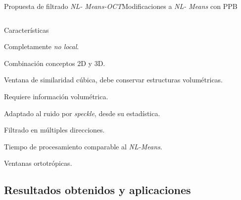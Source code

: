\documentclass[fleqn,10pt]{beamer}
\begin{document}
\begin{frame}{Propuesta de filtrado \emph{NL- Means-OCT}}{Modificaciones a \emph{NL- Means} con PPB}
\begin{multicols}{2}
{\begin{equation*}
			\end{equation*}}
		{\scriptsize \begin{block}{Características}
			\begin{itemize}
				\item Completamente \emph{no local}.	
				\item Combinación conceptos 2D y 3D.
				\item Ventana de similaridad cúbica, debe conservar estructuras volumétricas.
				\item Requiere información volumétrica.
				\item Adaptado al ruido por \emph{speckle}, desde su estadística.
				\item Filtrado en múltiples direcciones.
				{\color{violet}	\item Tiempo de procesamiento comparable al \emph{NL-Means}.
					\item Ventanas ortotrópicas.}
			\end{itemize}
		\end{block}}
	\end{multicols}
\end{frame}

\subsection[Resultados]{Resultados obtenidos y aplicaciones}
\end{document}
